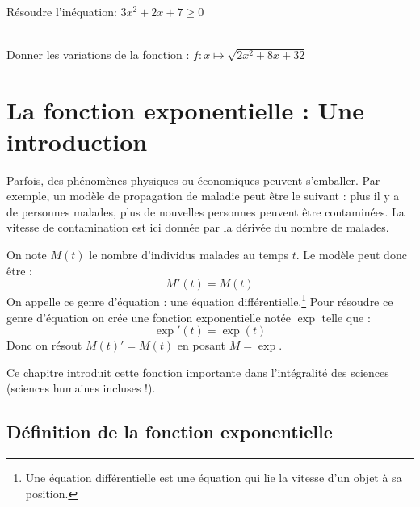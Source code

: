 \documentclass[12pt,fleqn]{report} %
\begin{document}
\begin{exercise}\label{Exercice 36}\text{ }\\
	Résoudre l'inéquation: $3x^2+2x+7\ge0$
\end{exercise}

\begin{exercise}\label{Exercice 37}\text{ }\\
	Donner les variations de la fonction : $f : x \mapsto \sqrt{2x^2+8x+32}$
\end{exercise}


\setcounter{chapter}{1}

\chapter{La fonction exponentielle : Une introduction}
Parfois, des phénomènes physiques ou économiques peuvent s'emballer. Par exemple, un modèle de propagation de maladie peut être le suivant : plus il y a de personnes malades, plus de nouvelles personnes peuvent être contaminées. La vitesse de contamination est ici donnée par la dérivée du nombre de malades. 

On note $M(t)$ le nombre d'individus malades au temps $t$. Le modèle peut donc être :
\[
M'(t) = M(t)
\]
On appelle ce genre d'équation : une équation différentielle.\footnote{Une équation différentielle est une équation qui lie la vitesse d'un objet à sa position.}
Pour résoudre ce genre d'équation on crée une fonction exponentielle notée $\exp$ telle que :
\[
\exp'(t) =\exp(t)
\] 
Donc on résout $M(t)' = M(t)$ en posant $M = \exp$.

Ce chapitre introduit cette fonction importante dans l'intégralité des sciences (sciences humaines incluses !).
\section{Définition de la fonction exponentielle}
\end{document}
